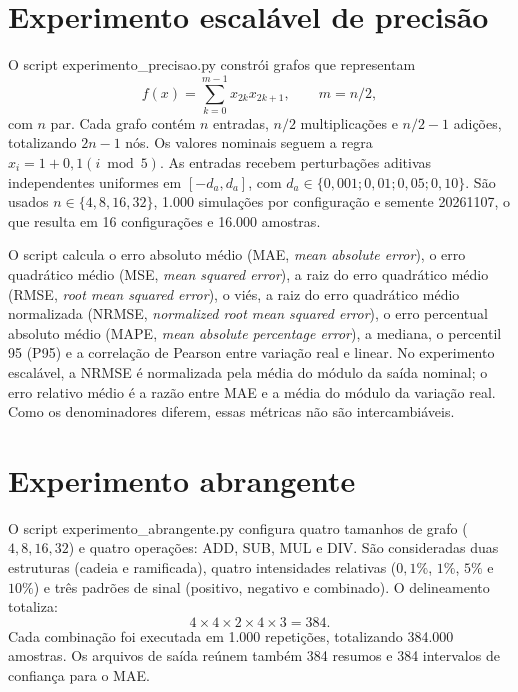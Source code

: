 \documentclass[12pt,openright,oneside,a4paper,brazil]{abntex2}
\newcommand{\arquivo}[1]{\textsf{\small #1}}
\begin{document}
\section{Experimento escalável de precisão}
O script \arquivo{experimento\_precisao.py} constrói grafos que representam
\begin{equation}
f(x)=\sum_{k=0}^{m-1}x_{2k}x_{2k+1},\qquad m=n/2,
\label{eq:funcao-escalavel}
\end{equation}
com $n$ par. Cada grafo contém $n$ entradas, $n/2$ multiplicações e $n/2-1$ adições, totalizando $2n-1$ nós. Os valores nominais seguem a regra $x_i=1+0{,}1(i\bmod 5)$. As entradas recebem perturbações aditivas independentes uniformes em $[-d_a,d_a]$, com $d_a\in\{0{,}001;0{,}01;0{,}05;0{,}10\}$. São usados $n\in\{4{,}8{,}16{,}32\}$, 1.000 simulações por configuração e semente 20261107, o que resulta em 16 configurações e 16.000 amostras.

O script calcula o erro absoluto médio (MAE, \textit{mean absolute error}), o erro quadrático médio (MSE, \textit{mean squared error}), a raiz do erro quadrático médio (RMSE, \textit{root mean squared error}), o viés, a raiz do erro quadrático médio normalizada (NRMSE, \textit{normalized root mean squared error}), o erro percentual absoluto médio (MAPE, \textit{mean absolute percentage error}), a mediana, o percentil 95 (P95) e a correlação de Pearson entre variação real e linear. No experimento escalável, a NRMSE é normalizada pela média do módulo da saída nominal; o erro relativo médio é a razão entre MAE e a média do módulo da variação real. Como os denominadores diferem, essas métricas não são intercambiáveis.

\section{Experimento abrangente}
O script \arquivo{experimento\_abrangente.py} configura quatro tamanhos de grafo ($4, 8, 16, 32$) e quatro operações: ADD, SUB, MUL e DIV. São consideradas duas estruturas (cadeia e ramificada), quatro intensidades relativas ($0{,}1\%$, $1\%$, $5\%$ e $10\%$) e três padrões de sinal (positivo, negativo e combinado). O delineamento totaliza:
\begin{equation}
4\times4\times2\times4\times3=384.
\end{equation}
Cada combinação foi executada em 1.000 repetições, totalizando 384.000 amostras. Os arquivos de saída reúnem também 384 resumos e 384 intervalos de confiança para o MAE.
\end{document}
